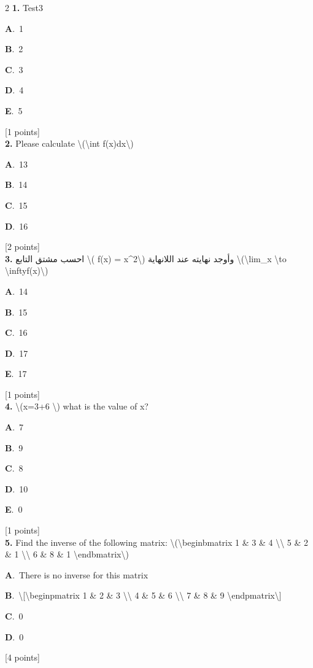 \documentclass[12pt]{article}
\newcommand{\choice}[3]{%
  \noindent\textbf{#1}.~#2\hfill#3\par\vspace{0.25em}
}
\begin{document}
\begin{multicols}{2}
\noindent \textbf{\textenglish{1.}} {\textenglish{Test3}}

\noindent\choice{A}{{\textenglish{1}}}{}
\noindent\choice{B}{{\textenglish{2}}}{}
\noindent\choice{C}{{\textenglish{3}}}{}
\noindent\choice{D}{{\textenglish{4}}}{}
\noindent\choice{E}{{\textenglish{5}}}{}
\hfill {\textenglish{[1 points]}}\\[0.5em]

\noindent \textbf{\textenglish{2.}} {\textenglish{Please calculate \textbackslash{}(\textbackslash{}int f(x)dx\textbackslash{})}}

\noindent\choice{A}{{\textenglish{13}}}{}
\noindent\choice{B}{{\textenglish{14}}}{}
\noindent\choice{C}{{\textenglish{15}}}{}
\noindent\choice{D}{{\textenglish{16}}}{}
\hfill {\textenglish{[2 points]}}\\[0.5em]

\noindent \textbf{\textenglish{3.}} {\textarabic{احسب مشتق التابع \textbackslash{}( f(x) = x\^{}2\textbackslash{}) وأوجد نهايته عند اللانهاية \textbackslash{}(\textbackslash{}lim\_{x \textbackslash{}to \textbackslash{}infty}f(x)\textbackslash{})}}

\noindent\choice{A}{{\textenglish{14}}}{}
\noindent\choice{B}{{\textenglish{15}}}{}
\noindent\choice{C}{{\textenglish{16}}}{}
\noindent\choice{D}{{\textenglish{17}}}{}
\noindent\choice{E}{{\textenglish{17}}}{}
\hfill {\textenglish{[1 points]}}\\[0.5em]

\noindent \textbf{\textenglish{4.}} {\textenglish{\textbackslash{}(x=3+6 \textbackslash{}) what is the value of x?}}

\noindent\choice{A}{{\textenglish{7}}}{}
\noindent\choice{B}{{\textenglish{9}}}{}
\noindent\choice{C}{{\textenglish{8}}}{}
\noindent\choice{D}{{\textenglish{10}}}{}
\noindent\choice{E}{{\textenglish{0}}}{}
\hfill {\textenglish{[1 points]}}\\[0.5em]

\noindent \textbf{\textenglish{5.}} {\textenglish{Find the inverse of the following matrix: \textbackslash{}(\textbackslash{}begin{bmatrix} 1 \& 3 \& 4 \textbackslash{}\textbackslash{} 5 \& 2 \& 1 \textbackslash{}\textbackslash{} 6 \& 8 \& 1 \textbackslash{}end{bmatrix}\textbackslash{})}}

\noindent\choice{A}{{\textenglish{There is no inverse for this matrix}}}{}
\noindent\choice{B}{{\textenglish{\textbackslash{}[\textbackslash{}begin{pmatrix} 1 \& 2 \& 3 \textbackslash{}\textbackslash{} 4 \& 5 \& 6 \textbackslash{}\textbackslash{} 7 \& 8 \& 9  \textbackslash{}end{pmatrix}\textbackslash{}]}}}{}
\noindent\choice{C}{{\textenglish{0}}}{}
\noindent\choice{D}{{\textenglish{0}}}{}
\hfill {\textenglish{[4 points]}}\\[0.5em]


\end{multicols}
\end{document}
